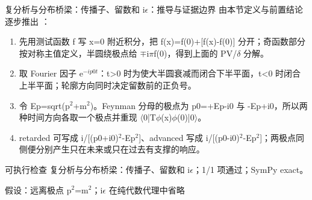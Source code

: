 \begin{frame}[t]{复分析与分布桥梁：传播子、留数和 i\ensuremath{\epsilon}：推导与证据边界}
\footnotesize
{}\quad 由本节定义与前置结论逐步推出 ：
\begin{enumerate}
\item 先用测试函数 f 写 x=0 附近积分，把 f(x)=f(0)+[f(x)-f(0)] 分开；奇函数部分按对称主值定义，半圆绕极点给 \ensuremath{\mp}i\ensuremath{\pi}f(0)，得到上面的 PV/\allowbreak{}\ensuremath{\delta} 分解。
\item 取 Fourier 因子 e\ensuremath{^{-ip0t}}：t>0 时为使大半圆衰减而闭合下半平面，t<0 时闭合上半平面；轮廓方向同时决定留数前的正负号。
\item 令 Ep=sqrt(p\ensuremath{^{2}}+m\ensuremath{^{2}})。Feynman 分母的极点为 p0=+Ep-i0 与 -Ep+i0，所以两种时间方向各取一个极点并重现 \ensuremath{\langle}0|T\ensuremath{\phi}(x)\ensuremath{\phi}(0)|0\ensuremath{\rangle}。
\item retarded 可写成 i/\allowbreak{}[(p0+i0)\ensuremath{^{2}}-Ep\ensuremath{^{2}}]、advanced 写成 i/\allowbreak{}[(p0-i0)\ensuremath{^{2}}-Ep\ensuremath{^{2}}]；两极点同侧便分别产生只在未来或只在过去有支撑的响应。
\end{enumerate}\begin{block}{可执行检查}
\quad 复分析与分布桥梁：传播子、留数和 i\ensuremath{\epsilon}；1/1 项通过；SymPy exact。
\par\scriptsize 假设：远离极点 p\ensuremath{^{2}}=m\ensuremath{^{2}}；i\ensuremath{\epsilon} 在纯代数代理中省略
\end{block}
\end{frame}

